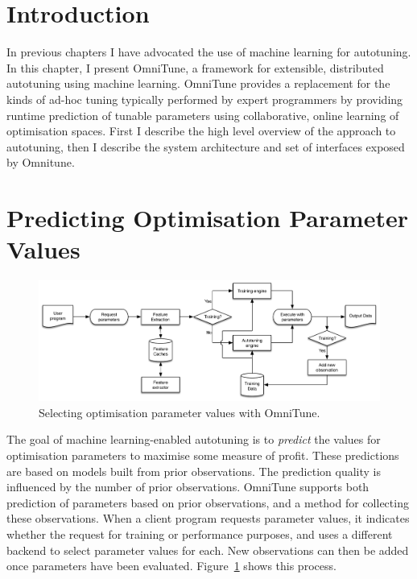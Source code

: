\section{Introduction}

In previous chapters I have advocated the use of machine learning for
autotuning. In this chapter, I present OmniTune, a framework for
extensible, distributed autotuning using machine learning. OmniTune
provides a replacement for the kinds of ad-hoc tuning typically
performed by expert programmers by providing runtime prediction of
tunable parameters using collaborative, online learning of
optimisation spaces. First I describe the high level overview of the
approach to autotuning, then I describe the system architecture and
set of interfaces exposed by Omnitune.


\section{Predicting Optimisation Parameter Values}

\begin{figure}[b]
\centering
\includegraphics[width=\textwidth]{img/omnitune-system-flow.pdf}
\caption[Optimisation parameter selection with OmniTune]{%
  Selecting optimisation parameter values with OmniTune.%
}
\label{fig:omnitune-system-flow}
\end{figure}

The goal of machine learning-enabled autotuning is to \emph{predict}
the values for optimisation parameters to maximise some measure of
profit. These predictions are based on models built from prior
observations. The prediction quality is influenced by the number of
prior observations. OmniTune supports both prediction of parameters
based on prior observations, and a method for collecting these
observations. When a client program requests parameter values, it
indicates whether the request for training or performance purposes,
and uses a different backend to select parameter values for each. New
observations can then be added once parameters have been evaluated.
Figure~\ref{fig:omnitune-system-flow} shows this process.


